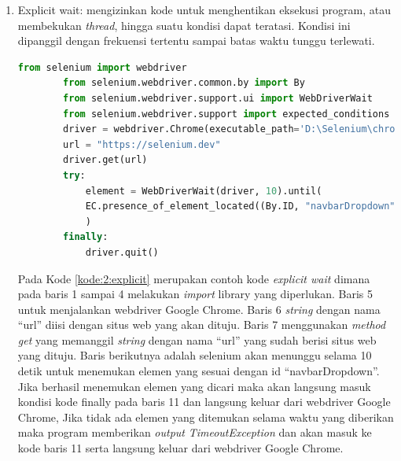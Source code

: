 \begin{enumerate}
	\item Explicit wait: mengizinkan kode untuk menghentikan eksekusi program, atau membekukan \textit{thread}, hingga suatu kondisi dapat teratasi. Kondisi ini dipanggil dengan frekuensi tertentu sampai batas waktu tunggu terlewati.
	\begin{lstlisting}[language=python, caption=Contoh kode Explicit wait, label=kode:2:explicit]
		from selenium import webdriver
		from selenium.webdriver.common.by import By
		from selenium.webdriver.support.ui import WebDriverWait
		from selenium.webdriver.support import expected_conditions as EC
		driver = webdriver.Chrome(executable_path='D:\Selenium\chromedriver.exe')
		url = "https://selenium.dev"
		driver.get(url)	
		try:
			element = WebDriverWait(driver, 10).until(
			EC.presence_of_element_located((By.ID, "navbarDropdown"))
			)
		finally:
			driver.quit()
	\end{lstlisting}
	Pada Kode \ref{kode:2:explicit} merupakan contoh kode \textit{explicit wait} dimana pada baris 1 sampai 4 melakukan \textit{import} library yang diperlukan. Baris 5 untuk menjalankan webdriver Google Chrome. Baris 6 \textit{string} dengan nama ``url'' diisi dengan situs web yang akan dituju. Baris 7 menggunakan \textit{method get} yang memanggil \textit{string} dengan nama ``url'' yang sudah berisi situs web yang dituju. Baris berikutnya adalah selenium akan menunggu selama 10 detik untuk menemukan elemen yang sesuai dengan id ``navbarDropdown''. Jika berhasil menemukan elemen yang dicari maka akan langsung masuk kondisi kode finally pada baris 11 dan langsung keluar dari webdriver Google Chrome, Jika tidak ada elemen yang ditemukan selama waktu yang diberikan maka program memberikan \textit{output} \textit{TimeoutException} dan akan masuk ke kode baris 11 serta langsung keluar dari webdriver Google Chrome.
	
\end{enumerate}










